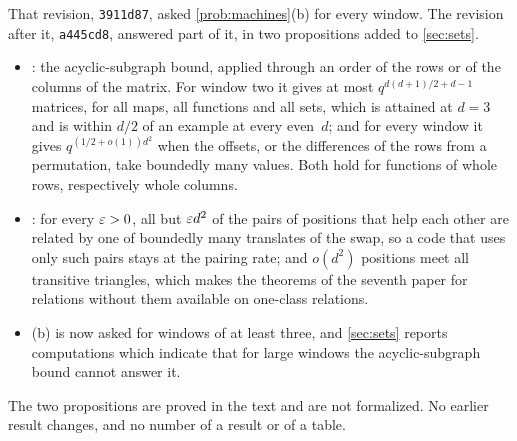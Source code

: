 That revision, \texttt{3911d87}, asked \cref{prob:machines}(b) for every window. The revision after it,
\texttt{a445cd8}, answered part of it, in two propositions added to \cref{sec:sets}.
\begin{itemize}[leftmargin=1.5em]
\item {}: the acyclic-subgraph bound, applied through an order of the rows or of the columns of the
matrix. For window two it gives at most $q^{d(d+1)/2+d-1}$ matrices, for all maps, all functions and all sets,
which is attained at $d=3$ and is within $d/2$ of an example at every even~$d$; and
for every window it gives $q^{(1/2+o(1))d^2}$ when the offsets, or the differences of the rows from a permutation,
take boundedly many values. Both hold for functions of whole rows, respectively whole columns.
\item {}: for every $\varepsilon>0$, all but $\varepsilon d^2$ of the pairs of positions that help each other are
related by one of boundedly many translates of the swap, so a code that uses only such pairs stays at the pairing
rate; and $o(d^2)$ positions meet all transitive triangles, which makes the theorems of the seventh paper for
relations without them available on one-class relations.
\item {}(b) is now asked for windows of at least three, and \cref{sec:sets} reports computations
which indicate that for large windows the acyclic-subgraph bound cannot answer it.
\end{itemize}
The two propositions are proved in the text and are not formalized. No earlier result changes, and no number of a
result or of a table.

